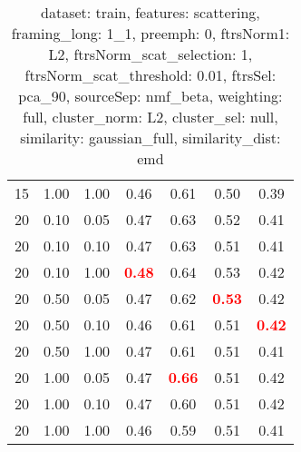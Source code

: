 \begin{table}
\begin{center}
\begin{tabular}{lllcccc}
15 & 1.00 & 1.00 & 0.46 & 0.61 & 0.50 & 0.39 \\ 
20 & 0.10 & 0.05 & 0.47 & 0.63 & 0.52 & 0.41 \\ 
20 & 0.10 & 0.10 & 0.47 & 0.63 & 0.51 & 0.41 \\ 
20 & 0.10 & 1.00 & \textbf{\textcolor{red}{0.48}} & 0.64 & 0.53 & 0.42 \\ 
20 & 0.50 & 0.05 & 0.47 & 0.62 & \textbf{\textcolor{red}{0.53}} & 0.42 \\ 
20 & 0.50 & 0.10 & 0.46 & 0.61 & 0.51 & \textbf{\textcolor{red}{0.42}} \\ 
20 & 0.50 & 1.00 & 0.47 & 0.61 & 0.51 & 0.41 \\ 
20 & 1.00 & 0.05 & 0.47 & \textbf{\textcolor{red}{0.66}} & 0.51 & 0.42 \\ 
20 & 1.00 & 0.10 & 0.47 & 0.60 & 0.51 & 0.42 \\ 
20 & 1.00 & 1.00 & 0.46 & 0.59 & 0.51 & 0.41 \\ 
\end{tabular} 
\end{center} 
\caption{dataset: train, features: scattering, framing\_long: 1\_1, preemph: 0, ftrsNorm1: L2, ftrsNorm\_scat\_selection: 1, ftrsNorm\_scat\_threshold: 0.01, ftrsSel: pca\_90, sourceSep: nmf\_beta, weighting: full, cluster\_norm: L2, cluster\_sel: null, similarity: gaussian\_full, similarity\_dist: emd} 
\label{datasetrFeaturscFraminlong1_1Preemp0Ftrsnorm1L2Ftrsnoscatselect1Ftrsnoscatthresh0.01Ftrsselpc90SourcesepnmbeWeightfuClustenormL2ClusteselnuSimilagafuSimiladistem} 
\end{table} 
 
